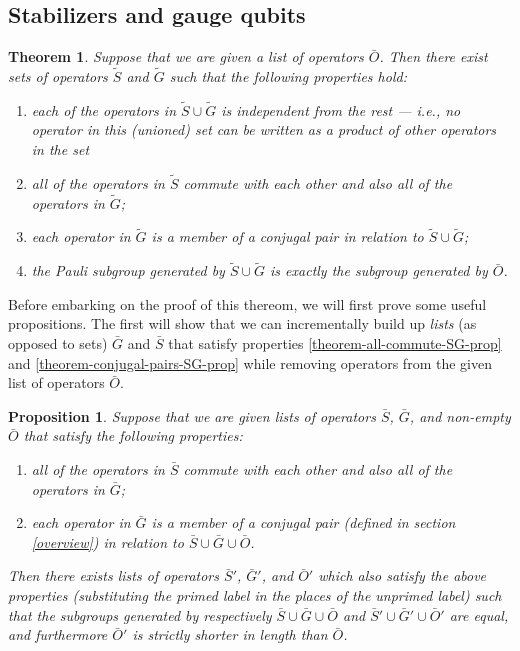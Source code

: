 \documentclass[twocolumn,showpacs,preprintnumbers,amsmath,amssymb,nofootinbib,pra,floatfix]{revtex4}
\newtheorem{theorem}{Theorem}
\newtheorem{proposition}{Proposition}
\newenvironment{remark}[1][Remark]{\begin{trivlist}
\item[\hskip \labelsep {\bfseries #1}]}{\end{trivlist}}
\newcommand{\lst}{\bar}
\newcommand{\set}{\tilde}
\begin{document}
\subsection{Stabilizers and gauge qubits}

\label{stabilizers-and-gauge-qubits}
\begin{theorem} \label{theorem-SG} Suppose that we are given a list of operators $\lst O$.  Then there exist sets of operators $\set S$ and $\set G$ such that the following properties hold:
\begin{enumerate}
\item each of the operators in $\set S \cup \set G$ is
  independent from the rest --- i.e., no operator in this (unioned) set can
  be written as a product of other operators in the set
\item \label{theorem-all-commute-SG-prop} all of the operators in $\set S$ commute with each other and
  also all of the operators in $\set G$;
\item \label{theorem-conjugal-pairs-SG-prop} each operator in $\set G$ is a member of a conjugal pair in relation to $\set S \cup \set G$;
\item \label{theorem-complete-SG-prop} the Pauli subgroup generated by $\set S \cup \set G$ is exactly
  the subgroup generated by $\lst O$.
\end{enumerate}
\end{theorem}
\begin{remark}
Before embarking on the proof of this thereom, we will first prove some useful propositions.  The first will show that we can incrementally build up \emph{lists} (as opposed to sets) $\lst G$ and $\lst S$ that satisfy properties \ref{theorem-all-commute-SG-prop} and \ref{theorem-conjugal-pairs-SG-prop} while removing operators from the given list of operators $\lst O$.
\end{remark}

\begin{proposition} \label{proposition-SG} Suppose that we are given lists of operators $\lst S$, $\lst G$, and non-empty $\lst O$ that satisfy the following properties:
\begin{enumerate}
\item all of the operators in $\lst S$ commute with each other and also all of the operators in $\lst G$; \label{stabs-commute-with-G}
\item each operator in $\lst G$ is a member of a \emph{conjugal pair} (defined in section \ref{overview}) in relation to $\lst S \cup \lst G \cup \lst O$. \label{conjugal-pairs-commute-with-SAG}
\end{enumerate}
Then there exists lists of operators $\lst S'$, $\lst G'$, and $\lst O'$ which also satisfy the above properties (substituting the primed label in the places of the unprimed label) such that the subgroups generated by respectively $\lst S\cup \lst G\cup \lst O$ and $\lst S'\cup \lst G'\cup \lst O'$ are equal, and furthermore $\lst O'$ is strictly shorter in length than $\lst O$.
\end{proposition}
\end{document}
